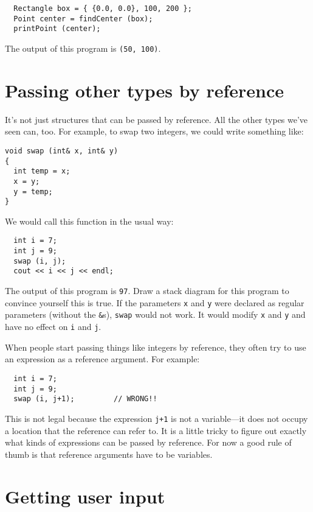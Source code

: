 \begin{verbatim}
  Rectangle box = { {0.0, 0.0}, 100, 200 };
  Point center = findCenter (box);
  printPoint (center);
\end{verbatim}
%
The output of this program is {\tt (50, 100)}.

\section {Passing other types by reference}

It's not just structures that can be passed by reference.
All the other types we've seen can, too.  For example, to swap
two integers, we could write something like:

\begin{verbatim}
void swap (int& x, int& y)
{
  int temp = x;
  x = y;
  y = temp;
}
\end{verbatim}
%
We would call this function in the usual way:

\begin{verbatim}
  int i = 7;
  int j = 9;
  swap (i, j);
  cout << i << j << endl;
\end{verbatim}
%
The output of this program is {\tt 97}.  Draw a stack
diagram for this program to convince yourself this is true.
If the parameters {\tt x} and {\tt y} were declared as
regular parameters (without the {\tt \&}s), {\tt swap} would
not work.  It would modify {\tt x} and {\tt y} and have no
effect on {\tt i} and {\tt j}.

When people start passing things like integers by reference,
they often try to use an expression
as a reference argument.  For example:

\begin{verbatim}
  int i = 7;
  int j = 9;
  swap (i, j+1);         // WRONG!!
\end{verbatim}
%
This is not legal because the expression {\tt j+1} is not
a variable---it does not occupy a location that the reference
can refer to.  It is a little tricky to figure out exactly
what kinds of expressions can be passed by reference.  For now
a good rule of thumb is that reference arguments have to be
variables.

\section{Getting user input}
\label{input}

